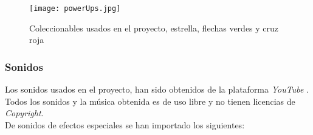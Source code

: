 \begin{figure}[H]
    \centering
    \texttt{[image: powerUps.jpg]}
    \caption{Coleccionables usados en el proyecto, estrella, flechas verdes y cruz roja}
\end{figure}


\subsubsection{Sonidos}

Los sonidos usados en el proyecto, han sido obtenidos de la plataforma \textit{YouTube} \cite{YouTube}. Todos los sonidos y la música obtenida es de uso libre y no tienen licencias de \textit{Copyright}.\\

De sonidos de efectos especiales se han importado los siguientes: 
